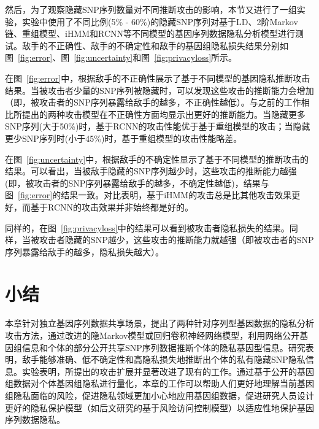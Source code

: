 然后，为了观察隐藏SNP序列数量对不同推断攻击的影响，本节又进行了一组实验，实验中使用了不同比例(5\% - 60\%)的隐藏SNP序列对基于LD、2阶Markov链、重组模型、iHMM和RCNN等不同模型的基因序列数据隐私分析模型进行测试。敌手的不正确性、敌手的不确定性和敌手的基因组隐私损失结果分别如图~\ref{fig:error}、图~\ref{fig:uncertainty}和图~\ref{fig:privacyloss}所示。

在图~\ref{fig:error}中，根据敌手的不正确性展示了基于不同模型的基因隐私推断攻击结果。当被攻击者少量的SNP序列被隐藏时，可以发现这些攻击的推断能力会增加（即，被攻击者的SNP序列暴露给敌手的越多，不正确性越低）。与之前的工作相比所提出的两种攻击模型在不正确性方面均显示出更好的推断能力。当隐藏更多SNP序列(大于50\%)时，基于RCNN的攻击性能优于基于重组模型的攻击；当隐藏更少SNP序列时(小于45\%)时，基于重组模型的攻击性能略差。

在图~\ref{fig:uncertainty}中，根据敌手的不确定性显示了基于不同模型的推断攻击的结果。可以看出，当被敌手隐藏的SNP序列越少时，这些攻击的推断能力越强(即，被攻击者的SNP序列暴露给敌手的越多，不确定性越低)，结果与图~\ref{fig:error}的结果一致。对比表明，基于iHMM的攻击总是比其他攻击效果更好，而基于RCNN的攻击效果并非始终都是好的。

同样的，在图~\ref{fig:privacyloss}中的结果可以看到被攻击者隐私损失的结果。同样，当被攻击者隐藏的SNP越少，这些攻击的推断能力就越强（即被攻击者的SNP序列暴露给敌手的越多，隐私损失越大）。

\section{小结}\label{sec:concl}

本章针对独立基因序列数据共享场景，提出了两种针对序列型基因数据的隐私分析攻击方法，通过改进的隐Markov模型或回归卷积神经网络模型，利用网络公开基因组信息和个体的部分公开共享SNP序列数据推断个体的隐私基因型信息。研究表明，敌手能够准确、低不确定性和高隐私损失地推断出个体的私有隐藏SNP隐私信息。实验表明，所提出的攻击扩展并显著改进了现有的工作。通过基于公开的基因组数据对个体基因组隐私进行量化，本章的工作可以帮助人们更好地理解当前基因组隐私面临的风险，促进隐私领域更加小心地应用基因组数据，促进研究人员设计更好的隐私保护模型（如后文研究的基于风险访问控制模型）以适应性地保护基因序列数据隐私。

